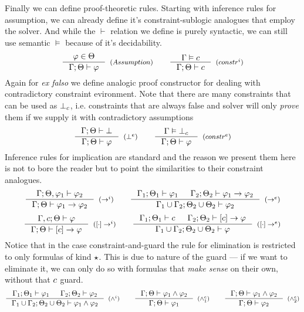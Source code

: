 \documentclass[english, mgr]{iithesis}
\begin{document}
Finally we can define proof-theoretic rules.
Starting with inference rules for assumption,
we can already define it's constraint-sublogic analogues that employ the solver.
And while the $\vdash$ relation we define is purely syntactic,
we can still use semantic $\vDash$ because of it's decidability.
$$
  \inference{
    \formphi \in \Theta
  }{
    \jgmnt[\cEnv;\Theta]{\formphi}
  }[(\ensuremath{Assumption})]
  \qquad
  \inference{
    \cjgmnt[\cEnv]{\constr}
  }{
    \jgmnt[\cEnv;\Theta]{\constr}
  }[(\ensuremath{constr^i})]
$$
Again for \textit{ex falso} we define analogic proof constructor for dealing with contradictory
constraint evironment.
Note that there are many constraints that can be used as $\bot_c$, i.e.
constraints that are always false and solver will only \textit{prove} them
if we supply it with contradictory assumptions
$$
  \inference{
    \jgmnt[\cEnv;\Theta]{\bot}
  }{
    \jgmnt[\cEnv;\Theta]{\formphi}
  }[(\ensuremath{\bot^e})]
  \qquad
  \inference{
    \cjgmnt[\cEnv]{\bot_\constr}
    }{
    \jgmnt[\cEnv;\Theta]{\formphi}
  }[(\ensuremath{constr^e})]
$$
Inference rules for implication are standard and the reason we present them here
is not to bore the reader but to point the similarities to their constraint analogues.
$$
  \inference{
    \jgmnt[\cEnv;\Theta,\formphi_1]{\formphi_2}
  }{
    \jgmnt[\cEnv;\Theta]{\formphi_1 \fImp \formphi_2}
  }[(\ensuremath{\fImp^i})]
  \qquad
  \inference{
    \jgmnt[\cEnv_1;\Theta_1]{\formphi_1} &
    \jgmnt[\cEnv_2;\Theta_2]{\formphi_1 \fImp \formphi_2}
    }{
    \jgmnt[\cEnv_1 \cup \cEnv_2;\Theta_2 \cup \Theta_2]{\formphi_2}
  }[(\ensuremath{\fImp^e})]
$$
$$
  \inference{
    \jgmnt[\cEnv, \constr;\Theta]{\formphi}
  }{
    \jgmnt[\cEnv;\Theta]{\fCImp{\constr}\formphi}
  }[(\ensuremath{\fCImp{\cdot}^i})]
  \qquad
  \inference{
    \jgmnt[\cEnv_1;\Theta_1]{\constr} &
    \jgmnt[\cEnv_2;\Theta_2]{\fCImp{\constr}\formphi}
    }{
    \jgmnt[\cEnv_1 \cup \cEnv_2;\Theta_2 \cup \Theta_2]{\formphi}
  }[(\ensuremath{\fCImp{\cdot}^e})]
$$
Notice that in the case constraint-and-guard the rule for elimination is restricted
to only formulas of kind $\star$.
This is due to nature of the guard --- if we want to eliminate it,
we can only do so with formulas that \textit{make sense} on their own,
without that $c$ guard.
$$
  \inference{
    \jgmnt[\cEnv_1;\Theta_1]{\formphi_1} &
    \jgmnt[\cEnv_2;\Theta_2]{\formphi_2}
  }{
    \jgmnt[\cEnv_1 \cup \cEnv_2;\Theta_2 \cup \Theta_2]{\formphi_1 \wedge \formphi_2}
  }[(\ensuremath{\wedge^i})]
  \qquad
  \inference{
    \jgmnt[\cEnv;\Theta]{\formphi_1 \wedge \formphi_2}
    }{
    \jgmnt[\cEnv;\Theta]{\formphi_1}
  }[(\ensuremath{\wedge^e_1})]\qquad
  \inference{
    \jgmnt[\cEnv;\Theta]{\formphi_1 \wedge \formphi_2}
    }{
    \jgmnt[\cEnv;\Theta]{\formphi_2}
  }[(\ensuremath{\wedge^e_2})]
$$
\end{document}
